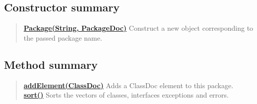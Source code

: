 \documentclass[11pt,a4paper]{report}
\begin{document}
{{{\subsection{Constructor summary}{
\begin{verse}
\hyperlink{org.stfm.texdoclet.Package(java.lang.String, com.sun.javadoc.PackageDoc)}{{\bf Package(String, PackageDoc)}} Construct a new object corresponding to the passed package name.\\
\end{verse}
}
\subsection{Method summary}{
\begin{verse}
\hyperlink{org.stfm.texdoclet.Package.addElement(com.sun.javadoc.ClassDoc)}{{\bf addElement(ClassDoc)}} Adds a ClassDoc element to this package.\\
\hyperlink{org.stfm.texdoclet.Package.sort()}{{\bf sort()}} Sorts the vectors of classes, interfaces exceptions and errors.\\
\end{verse}
}
}}}
\end{document}
